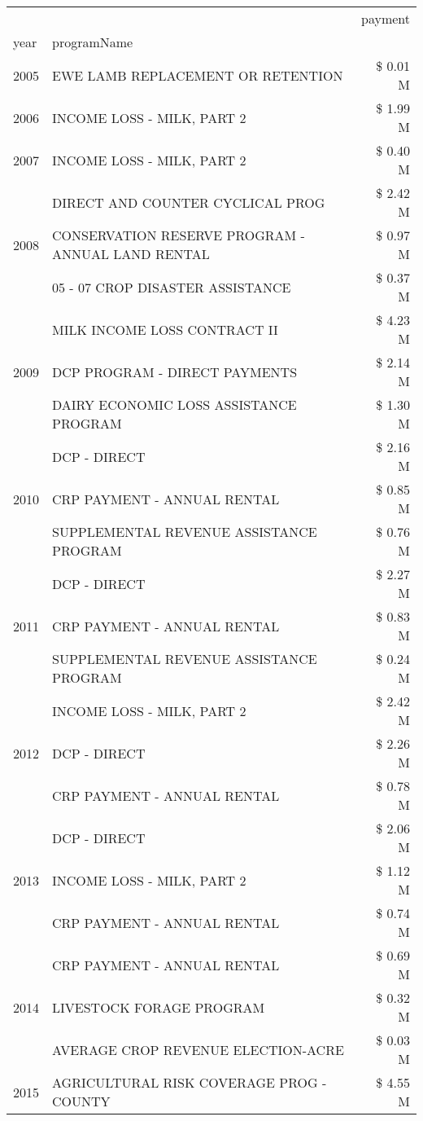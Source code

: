 \begin{tabular}{llr}
\toprule
 &  & payment \\
year & programName &  \\
\midrule
2005 & EWE LAMB REPLACEMENT OR RETENTION & \$ 0.01 M \\
\cline{1-3}
2006 & INCOME LOSS - MILK, PART 2 & \$ 1.99 M \\
\cline{1-3}
2007 & INCOME LOSS - MILK, PART 2 & \$ 0.40 M \\
\cline{1-3}
\multirow[t]{3}{*}{2008} & DIRECT AND COUNTER CYCLICAL PROG & \$ 2.42 M \\
 & CONSERVATION RESERVE PROGRAM - ANNUAL LAND RENTAL & \$ 0.97 M \\
 & 05 - 07 CROP DISASTER ASSISTANCE & \$ 0.37 M \\
\cline{1-3}
\multirow[t]{3}{*}{2009} & MILK INCOME LOSS CONTRACT II & \$ 4.23 M \\
 & DCP PROGRAM - DIRECT PAYMENTS & \$ 2.14 M \\
 & DAIRY ECONOMIC LOSS ASSISTANCE PROGRAM & \$ 1.30 M \\
\cline{1-3}
\multirow[t]{3}{*}{2010} & DCP - DIRECT & \$ 2.16 M \\
 & CRP PAYMENT - ANNUAL RENTAL & \$ 0.85 M \\
 & SUPPLEMENTAL REVENUE ASSISTANCE PROGRAM & \$ 0.76 M \\
\cline{1-3}
\multirow[t]{3}{*}{2011} & DCP - DIRECT & \$ 2.27 M \\
 & CRP PAYMENT - ANNUAL RENTAL & \$ 0.83 M \\
 & SUPPLEMENTAL REVENUE ASSISTANCE PROGRAM & \$ 0.24 M \\
\cline{1-3}
\multirow[t]{3}{*}{2012} & INCOME LOSS - MILK, PART 2 & \$ 2.42 M \\
 & DCP - DIRECT & \$ 2.26 M \\
 & CRP PAYMENT - ANNUAL RENTAL & \$ 0.78 M \\
\cline{1-3}
\multirow[t]{3}{*}{2013} & DCP - DIRECT & \$ 2.06 M \\
 & INCOME LOSS - MILK, PART 2 & \$ 1.12 M \\
 & CRP PAYMENT - ANNUAL RENTAL & \$ 0.74 M \\
\cline{1-3}
\multirow[t]{3}{*}{2014} & CRP PAYMENT - ANNUAL RENTAL & \$ 0.69 M \\
 & LIVESTOCK FORAGE PROGRAM & \$ 0.32 M \\
 & AVERAGE CROP REVENUE ELECTION-ACRE & \$ 0.03 M \\
\cline{1-3}
\multirow[t]{3}{*}{2015} & AGRICULTURAL RISK COVERAGE PROG - COUNTY & \$ 4.55 M \\

\end{tabular}
